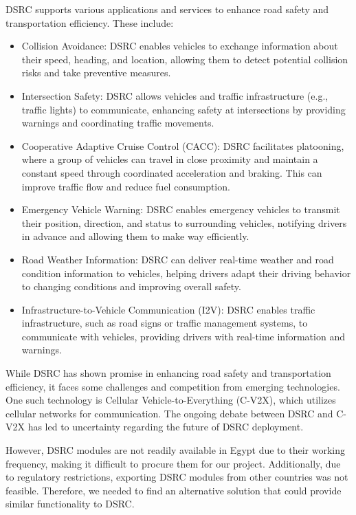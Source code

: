 \documentclass[
12pt,
oneside, 
onehalfspacing, 
nolistspacing, 
parskip, 
chapterinoneline, 
]{AASTCOMPUTER}
\begin{document}
DSRC supports various applications and services to enhance road safety and transportation efficiency. These include:

\begin{itemize}
    \item Collision Avoidance: DSRC enables vehicles to exchange information about their speed, heading, and location, allowing them to detect potential collision risks and take preventive measures.
    \item Intersection Safety: DSRC allows vehicles and traffic infrastructure (e.g., traffic lights) to communicate, enhancing safety at intersections by providing warnings and coordinating traffic movements.
    \item Cooperative Adaptive Cruise Control (CACC): DSRC facilitates platooning, where a group of vehicles can travel in close proximity and maintain a constant speed through coordinated acceleration and braking. This can improve traffic flow and reduce fuel consumption.
    \item Emergency Vehicle Warning: DSRC enables emergency vehicles to transmit their position, direction, and status to surrounding vehicles, notifying drivers in advance and allowing them to make way efficiently.
    \item Road Weather Information: DSRC can deliver real-time weather and road condition information to vehicles, helping drivers adapt their driving behavior to changing conditions and improving overall safety.
    \item Infrastructure-to-Vehicle Communication (I2V): DSRC enables traffic infrastructure, such as road signs or traffic management systems, to communicate with vehicles, providing drivers with real-time information and warnings.
\end{itemize}

While DSRC has shown promise in enhancing road safety and transportation efficiency, it faces some challenges and competition from emerging technologies. One such technology is Cellular Vehicle-to-Everything (C-V2X), which utilizes cellular networks for communication. The ongoing debate between DSRC and C-V2X has led to uncertainty regarding the future of DSRC deployment.

However, DSRC modules are not readily available in Egypt due to their working frequency, making it difficult to procure them for our project. Additionally, due to regulatory restrictions, exporting DSRC modules from other countries was not feasible. Therefore, we needed to find an alternative solution that could provide similar functionality to DSRC.
\end{document}
